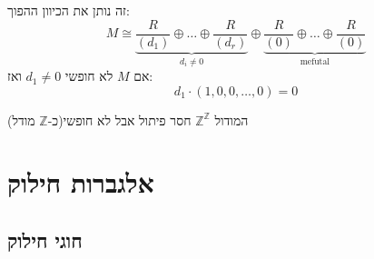 \documentclass{tstextbook}
\begin{document}
זה נותן את הכיוון ההפוך:
$$M\cong  \underbrace{ \frac{R}{(d_{1})}\oplus \dots \oplus \frac{R}{(d_{r})}  }_{ d_{i}\neq 0 }\oplus \underbrace{ \frac{R}{(0)}\oplus \dots \oplus \frac{R}{(0)} }_{ \text{mefutal} }$$
אם \(M\) לא חופשי \(d_{1}\neq 0\) ואז:
$$d_{1}\cdot (1,0,0,\dots,0)=0$$

\begin{example}
המודול \(\mathbb{Z}^{\mathbb{Z}}\) חסר פיתול אבל לא חופשי(כ-\(\mathbb{Z}\) מודל)

\end{example}
\chapter{אלגברות חילוק}

\section{חוגי חילוק}
\end{document}
